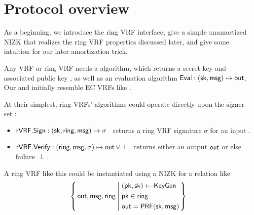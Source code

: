 \section{Protocol overview}
\label{sec:overview}

As a beginning, we introduce the ring VRF interface, give a simple
unamortized NIZK that realizes the ring VRF properties discussed later,
and give some intuition for our later amortization trick.

Any VRF or ring VRF needs a \KeyGen algorithm, which returns a secret key \sk
and associated public key \pk, as well as an evaluation algorithm
${\mathsf{Eval}} : (\mathsf{sk},\mathsf{msg}) \mapsto {\ensuremath{\mathsf{out}}}$. %
%
Our \KeyGen and \Eval initially resemble EC VRFs like \cite{nsec5,VXEd25519,draft-irtf-cfrg-vrf-10}.

At their simplest, ring VRFs' algorithms could operate directly
upon the signer set \ring:
\begin{itemize}
\item ${\mathsf{rVRF}}.{\mathsf{Sign}} : (\mathsf{sk},\mathsf{ring},\mathsf{msg}) \mapsto \sigma$ \,
    returns a ring VRF signature $\sigma$ for an input \msg.
\item ${\mathsf{rVRF}}.{\mathsf{Verify}} : (\mathsf{ring},\mathsf{msg},\sigma) \mapsto {\ensuremath{\mathsf{out}}} \, \lor \perp$ \,
    returns either an output ${\mathsf{out}}$ or else failure $\perp$.
\end{itemize}

A ring VRF like this could be instantiated using a NIZK for a relation like
$$ \Setst{ \Out, \msg, \ring}{
    \eprint{
        (\pk,\sk) \leftarrow \KeyGen, \quad %
        \pk \in \ring, \quad
        \Out = \PRF(\sk,\msg)
    }{
        \begin{aligned}
        & (\pk,\sk) \leftarrow \KeyGen \\
        & \pk \in \ring \\
        & \Out = \PRF(\sk,\msg)
        \end{aligned}
    }
} $$

